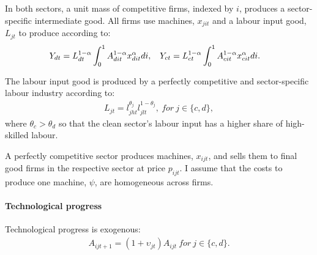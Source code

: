 In both sectors, a unit mass of competitive firms, indexed by $i$, produces a sector-specific intermediate good. All firms use machines, $x_{jit}$ and a labour input good, $L_{jt}$ to produce according to: %
\begin{align*}
&Y_{dt}= L_{dt}^{1-\alpha}\int_{0}^{1}A_{dit}^{1-\alpha}x_{dit}^{\alpha} di,\ \hspace{2mm} Y_{ct}= L_{ct}^{1-\alpha}\int_{0}^{1}A_{cit}^{1-\alpha}x_{cit}^{\alpha} di.
\end{align*}

The labour input good is produced by a perfectly competitive and sector-specific labour industry according to: 
\begin{align}
L_{jt}=l_{jht}^{\theta_j}l_{jlt}^{1-\theta_j}, \ for \ j \in\{c,d\},
\end{align}
where $\theta_c>\theta_d$ so that the clean sector's labour input has a higher share of high-skilled labour. 

A perfectly competitive sector produces machines, $x_{ijt}$, and sells them to final good firms in the respective sector at price $p_{ijt}$. I assume that the costs to produce one machine, $\psi$, are homogeneous across firms. %


\paragraph{Technological progress}
Technological progress is exogenous:
\begin{align}
A_{ijt+1}=(1+\upsilon_{jt}) A_{ijt}\ for \ j \in\{c,d\}. 
\end{align}

\begin{comment}
\paragraph{Impossibility of reaching target in laissez-faire with exogenous growth}
\tr{Note that this is wrong! There is an option for the gov to affect inflation which then redirects demand.}
Note that with exogenous growth in each sector there is no possibility for the government to stop emissions from growing, since production of the dirty good is essential for the consumption good (no perfect substitution: $\varepsilon<\infty$). To meet the emission target, the government either needs to affect the growth rate in the economy; i.e., $\upsilon_j$ is a choice variable, or work and consumption need to be set to zero; or the emission target has to be defined in relative terms. The latter possibility contradicts the Paris Agreement which is concerned with absolute emissions.  
I therefore assume, that the government can change the growth rate.

The government chooses the growth rate in each sector, taking into account that research is constrained by an exogenous  amount of scientists
\begin{align}
\upsilon_{ct}+\upsilon_{dt}\leq\Upsilon
\end{align}
\end{comment} 
  
